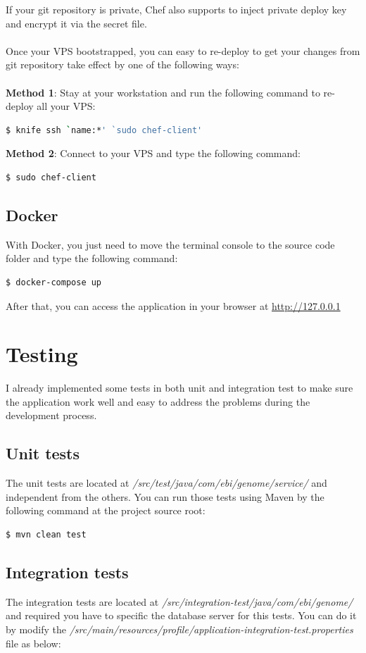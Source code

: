 \documentclass[a4paper,12pt]{article}
\begin{document}
If your git repository is private, Chef also supports to inject private deploy key and encrypt it via the secret file.
\\\\
Once your VPS bootstrapped, you can easy to re-deploy to get your changes from git repository take effect by one of the following ways:
\\
\\
\indent\textbf{Method 1}: Stay at your workstation and run the following command to re-deploy all your VPS:
\begin{lstlisting}[language=bash]
  $ knife ssh `name:*' `sudo chef-client'
\end{lstlisting}

\textbf{Method 2}: Connect to your VPS and type the following command:
\begin{lstlisting}[language=bash]
  $ sudo chef-client
\end{lstlisting}
\subsection{Docker}
With Docker, you just need to move the terminal console to the source code folder and type the following command:
\begin{lstlisting}[language=bash]
$ docker-compose up
\end{lstlisting}
After that, you can access the application in your browser at \url{http://127.0.0.1}

\section{Testing}
I already implemented some tests in both unit and integration test to make sure the application work well and easy to address the problems during the development process.
\subsection{Unit tests}
The unit tests are located at \textit{/src/test/java/com/ebi/genome/service/} and independent from the others. You can run those tests using Maven by the following command at the project source root:
\\
\begin{lstlisting}[language=bash]
  $ mvn clean test
\end{lstlisting}

\subsection{Integration tests}
The integration tests are located at \textit{/src/integration-test/java/com/ebi/genome/} and required you have to specific the database server for this tests. You can do it by modify the \textit{/src/main/resources/profile/application-integration-test.properties} file as below:
\end{document}
